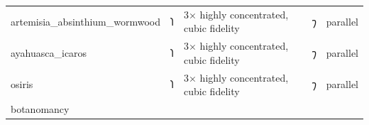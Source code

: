 \begin{longtable}[]{@{}lllll@{}}
\begin{minipage}[t]{0.17\columnwidth}
artemisia\_absinthium\_wormwood\strut
\end{minipage} & \begin{minipage}[t]{0.17\columnwidth}\raggedright
𐑐\strut
\end{minipage} & \begin{minipage}[t]{0.17\columnwidth}\raggedright
3× highly concentrated, cubic fidelity\strut
\end{minipage} & \begin{minipage}[t]{0.17\columnwidth}\raggedright
𐑠\strut
\end{minipage} & \begin{minipage}[t]{0.17\columnwidth}\raggedright
parallel\strut
\end{minipage}\tabularnewline
\begin{minipage}[t]{0.17\columnwidth}\raggedright
ayahuasca\_icaros\strut
\end{minipage} & \begin{minipage}[t]{0.17\columnwidth}\raggedright
𐑐\strut
\end{minipage} & \begin{minipage}[t]{0.17\columnwidth}\raggedright
3× highly concentrated, cubic fidelity\strut
\end{minipage} & \begin{minipage}[t]{0.17\columnwidth}\raggedright
𐑠\strut
\end{minipage} & \begin{minipage}[t]{0.17\columnwidth}\raggedright
parallel\strut
\end{minipage}\tabularnewline
\begin{minipage}[t]{0.17\columnwidth}\raggedright
osiris\strut
\end{minipage} & \begin{minipage}[t]{0.17\columnwidth}\raggedright
𐑐\strut
\end{minipage} & \begin{minipage}[t]{0.17\columnwidth}\raggedright
3× highly concentrated, cubic fidelity\strut
\end{minipage} & \begin{minipage}[t]{0.17\columnwidth}\raggedright
𐑠\strut
\end{minipage} & \begin{minipage}[t]{0.17\columnwidth}\raggedright
parallel\strut
\end{minipage}\tabularnewline
\begin{minipage}[t]{0.17\columnwidth}\raggedright
botanomancy\strut
\end{minipage} & \begin{minipage}[t]{0.17\columnwidth}\raggedright

\end{minipage}
\end{longtable}
